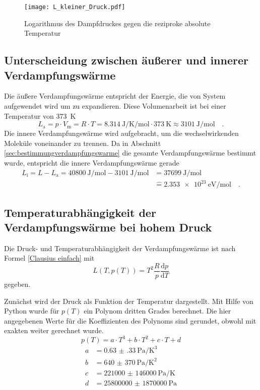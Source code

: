 \begin{figure}[h!]
	\centering
	\texttt{[image: L\_kleiner\_Druck.pdf]}
	\caption{Logarithmus des Dampfdruckes gegen die reziproke absolute Temperatur}
	\label{fig:L_kleiner_Druck}
\end{figure}

\subsection{Unterscheidung zwischen äußerer und innerer Verdampfungswärme}
Die äußere Verdampfungswärme entspricht der Energie, die von System aufgewendet wird um zu expandieren. Diese Volumenarbeit ist bei einer Temperatur von  \SI{373}{\kelvin}
\begin{equation}
L_\text{a} = p \cdot V_\text{m} = R \cdot T = \SI{8.314}{\joule\per\kelvin\per\mol} \cdot  \SI{373}{\kelvin} \approx \SI{3101}{\joule\per\mol} \quad.
\end{equation}
Die innere Verdampfungswärme wird aufgebracht, um die wechselwirkenden Moleküle voneinander zu trennen. Da in Abschnitt \ref{sec:bestimmungverdampfungswarme} die gesamte Verdampfungswärme bestimmt wurde, entspricht die innere Verdampfungswärme gerade
\begin{align}
L_\text{i} = L - L_{\text{a}} = \SI{40800}{\joule\per\mol} - \SI{3101}{\joule\per\mol} &= \SI{37699}{\joule\per\mol} \\
&\widehat{=} \SI{2.353e23}{\eV\per\mol}\quad.
\end{align}





\subsection{Temperaturabhängigkeit der Verdampfungswärme bei hohem Druck}
Die Druck- und Temperaturabhängigkeit der Verdampfungswärme ist nach Formel \eqref{Clausius einfach} mit
\begin{equation}
	L(T, p(T)) = T^2\frac{R}{p}\frac{\text{d}p}{\text{d}T}
\end{equation} gegeben.

Zunächst wird der Druck als Funktion der Temperatur dargestellt. Mit Hilfe von Python wurde für $p(T)$ ein Polynom dritten Grades berechnet. Die hier angegebenen Werte für die Koeffizienten des Polynoms sind gerundet, obwohl mit exakten weiter gerechnet wurde.
\begin{equation}
p(T) = a \cdot T ^3 + b \cdot T^2 +c \cdot T + d
\end{equation}
\begin{align}
a &=\SI{0.63(33)}{\pascal\per\kelvin\cubed}  \\
b &= \SI[per-mode = fraction]{640(370)}{\pascal\per\kelvin\squared}  \\
c &= \SI{221000(146000)}{\pascal\per\kelvin} \\
d  &= \SI{25800000(1870000)}{\pascal}
\end{align}


